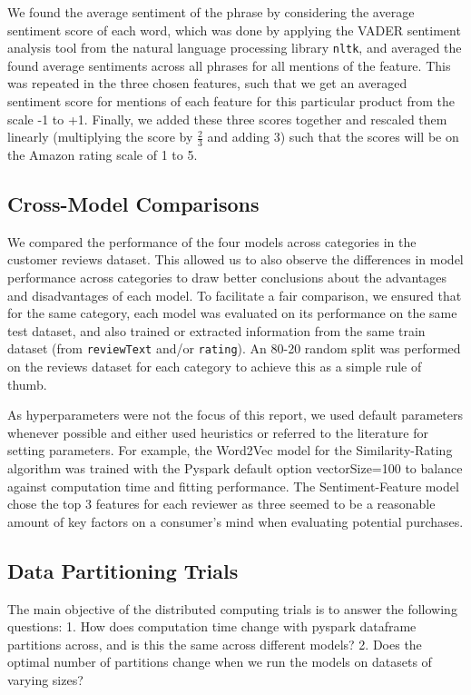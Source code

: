 \documentclass[sigconf,authorversion,nonacm]{acmart}
\begin{document}
    We found the average sentiment of the phrase by considering the average sentiment score of each word, which was done by applying the VADER sentiment analysis tool from the natural language processing library \verb|nltk|, and averaged the found average sentiments across all phrases for all mentions of the feature. This was repeated in the three chosen features, such that we get an averaged sentiment score for mentions of each feature for this particular product from the scale -1 to +1. Finally, we added these three scores together and rescaled them linearly (multiplying the score by $\frac{2}{3}$ and adding 3) such that the scores will be on the Amazon rating scale of 1 to 5. 

\subsection{Cross-Model Comparisons}

We compared the performance of the four models across categories in the customer reviews dataset. This allowed us to also observe the differences in model performance across categories to draw better conclusions about the advantages and disadvantages of each model. 
To facilitate a fair comparison, we ensured that for the same category, each model was evaluated on its performance on the same test dataset, and also trained or extracted information from the same train dataset (from \verb|reviewText| and/or \verb|rating|). An 80-20 random split was performed on the reviews dataset for each category to achieve this as a simple rule of thumb. 

As hyperparameters were not the focus of this report, we used default parameters whenever possible and either used heuristics or referred to the literature for setting parameters. For example, the Word2Vec model for the Similarity-Rating algorithm was trained with the Pyspark default option vectorSize=100 to balance against computation time and fitting performance. The Sentiment-Feature model chose the top 3 features for each reviewer as three seemed to be a reasonable amount of key factors on a consumer's mind when evaluating potential purchases. 

\subsection{Data Partitioning Trials}

The main objective of the distributed computing trials is to answer the following questions:
1. How does computation time change with pyspark dataframe partitions across, and is this the same across different models? 
2. Does the optimal number of partitions change when we run the models on datasets of varying sizes? 
\end{document}
